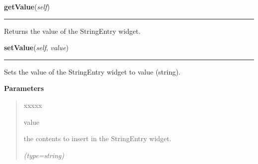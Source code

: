     \vspace{0.5ex}

\hspace{.8\funcindent}\begin{boxedminipage}{\funcwidth}

    \raggedright \textbf{getValue}(\textit{self})

    \vspace{-1.5ex}

    \rule{\textwidth}{0.5\fboxrule}
\setlength{\parskip}{2ex}
    Returns the value of the StringEntry widget.

\setlength{\parskip}{1ex}
    \end{boxedminipage}

    \label{nMOLDYN:GUI:Widgets:ComboFileBrowser:setValue}

    \vspace{0.5ex}

\hspace{.8\funcindent}\begin{boxedminipage}{\funcwidth}

    \raggedright \textbf{setValue}(\textit{self}, \textit{value})

    \vspace{-1.5ex}

    \rule{\textwidth}{0.5\fboxrule}
\setlength{\parskip}{2ex}
    Sets the value of the StringEntry widget to {\textbar}value{\textbar} 
    (string).

\setlength{\parskip}{1ex}
      \textbf{Parameters}
      \vspace{-1ex}

      \begin{quote}
        \begin{Ventry}{xxxxx}

          \item[value]

          the contents to insert in the StringEntry widget.

            {\it (type=string)}

        \end{Ventry}

      \end{quote}

    \end{boxedminipage}


